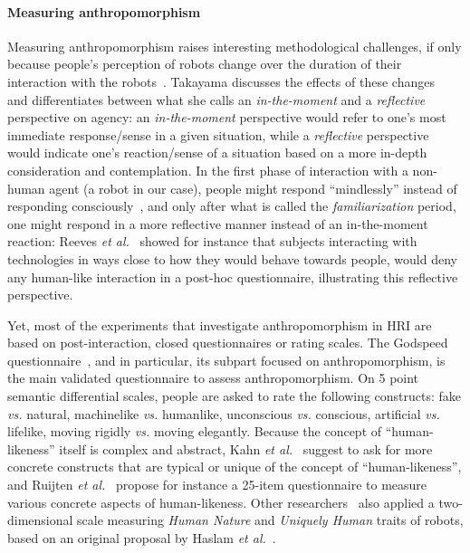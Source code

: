 \documentclass[lettersize, noapacite, twoside, HRI]{apa_HRI}
\newcommand{\etal}{\textit{et al.}\xspace}
\newcommand{\vs}{\textit{vs.}\xspace}
\begin{document}
\paragraph{Measuring anthropomorphism} Measuring anthropomorphism raises
interesting methodological challenges, if only because people's perception of
robots change over the duration of their interaction with the
robots~\cite{lemaignan2014dynamics}. Takayama discusses the effects of these
changes~\cite{takayama_perspectives_2012} and differentiates between what she
calls an \emph{in-the-moment} and a \emph{reflective} perspective on agency: an
\emph{in-the-moment} perspective would refer to one's most immediate
response/sense in a given situation, while a \emph{reflective} perspective would
indicate one's reaction/sense of a situation based on a more in-depth
consideration and contemplation.  In the first phase of interaction with a
non-human agent (a robot in our case), people might respond ``mindlessly''
instead of responding consciously~\cite{nass_machines_2000}, and only after what
is called the \emph{familiarization} period, one might respond in a more
reflective manner instead of an in-the-moment reaction: Reeves
\etal~\cite{reeves_media_1996} showed for instance that subjects interacting
with technologies in ways close to how they would behave towards people, would
deny any human-like interaction in a post-hoc questionnaire, illustrating this
reflective perspective.

Yet, most of the experiments that investigate anthropomorphism in HRI are based
on post-interaction, closed questionnaires or rating scales.  The Godspeed
questionnaire~\cite{bartneck_measurement_2008}, and in particular, its subpart
focused on anthropomorphism, is the main validated questionnaire to assess
anthropomorphism. On 5 point semantic differential scales, people are asked to
rate the following constructs: fake \vs natural, machinelike \vs humanlike,
unconscious \vs conscious, artificial \vs lifelike, moving rigidly \vs moving
elegantly. Because the concept of ``human-likeness'' itself is complex and
abstract, Kahn \etal~\cite{kahn_jr._robotic_2006} suggest to ask for more
concrete constructs that are typical or unique of the concept of
``human-likeness'', and Ruijten \etal~\cite{ruijten_introducing_2014} propose
for instance a 25-item questionnaire to measure various concrete aspects of
human-likeness. Other researchers~\cite{zlotowski2014dimensions,salem2015would}
also applied a two-dimensional scale measuring \emph{Human Nature} and
\emph{Uniquely Human} traits of robots, based on an original proposal by Haslam
\etal~\cite{haslam2008attributing}.
\end{document}
